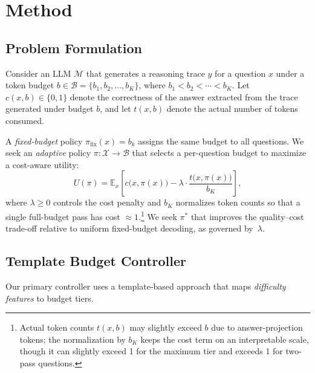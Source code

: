 \section{Method}
\label{sec:method}

\subsection{Problem Formulation}
\label{sec:method:formulation}

Consider an LLM $\mathcal{M}$ that generates a reasoning trace $y$ for a question $x$ under a token budget $b \in \mathcal{B} = \{b_1, b_2, \ldots, b_K\}$, where $b_1 < b_2 < \cdots < b_K$.
Let $c(x, b) \in \{0, 1\}$ denote the correctness of the answer extracted from the trace generated under budget $b$, and let $t(x, b)$ denote the actual number of tokens consumed.

A \emph{fixed-budget} policy $\pi_\text{fix}(x) = b_k$ assigns the same budget to all questions.
We seek an \emph{adaptive} policy $\pi: \mathcal{X} \to \mathcal{B}$ that selects a per-question budget to maximize a cost-aware utility:
\begin{equation}
    \label{eq:utility}
    U(\pi) = \mathbb{E}_{x}\left[ c\big(x, \pi(x)\big) - \lambda \cdot \frac{t\big(x, \pi(x)\big)}{b_K} \right],
\end{equation}
where $\lambda \geq 0$ controls the cost penalty and $b_K$ normalizes token counts so that a single full-budget pass has cost $\approx 1$.\footnote{Actual token counts $t(x,b)$ may slightly exceed $b$ due to answer-projection tokens; the normalization by $b_K$ keeps the cost term on an interpretable scale, though it can slightly exceed 1 for the maximum tier and exceeds 1 for two-pass questions.}
We seek $\pi^*$ that improves the quality--cost trade-off relative to uniform fixed-budget decoding, as governed by~$\lambda$.

\subsection{Template Budget Controller}
\label{sec:method:template}

Our primary controller uses a template-based approach that maps \emph{difficulty features} to budget tiers.

